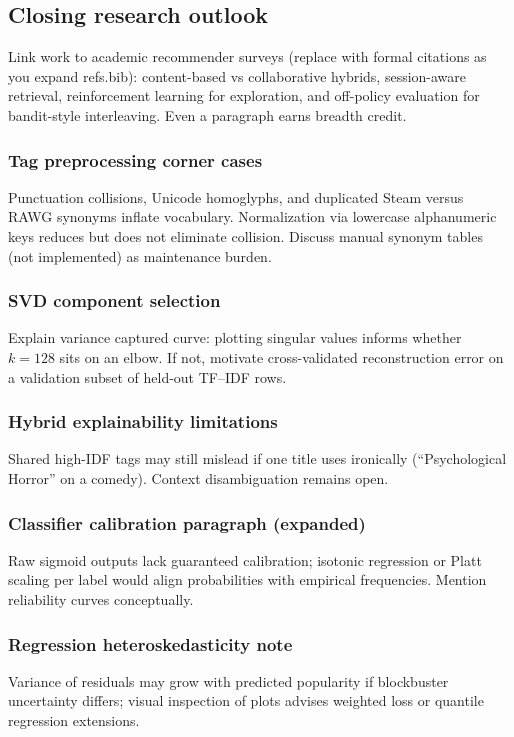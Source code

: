 \subsection{Closing research outlook}
Link work to academic recommender surveys (replace with formal citations as you expand refs.bib): content-based vs collaborative hybrids, session-aware retrieval, reinforcement learning for exploration, and off-policy evaluation for bandit-style interleaving. Even a paragraph earns breadth credit.


\subsubsection*{Tag preprocessing corner cases}
Punctuation collisions, Unicode homoglyphs, and duplicated Steam versus RAWG synonyms inflate vocabulary. Normalization via lowercase alphanumeric keys reduces but does not eliminate collision. Discuss manual synonym tables (not implemented) as maintenance burden.

\subsubsection*{SVD component selection}
Explain variance captured curve: plotting singular values informs whether $k=128$ sits on an elbow. If not, motivate cross-validated reconstruction error on a validation subset of held-out TF--IDF rows.

\subsubsection*{Hybrid explainability limitations}
Shared high-IDF tags may still mislead if one title uses ironically (``Psychological Horror'' on a comedy). Context disambiguation remains open.

\subsubsection*{Classifier calibration paragraph (expanded)}
Raw sigmoid outputs lack guaranteed calibration; isotonic regression or Platt scaling per label would align probabilities with empirical frequencies. Mention reliability curves conceptually.

\subsubsection*{Regression heteroskedasticity note}
Variance of residuals may grow with predicted popularity if blockbuster uncertainty differs; visual inspection of plots advises weighted loss or quantile regression extensions.

